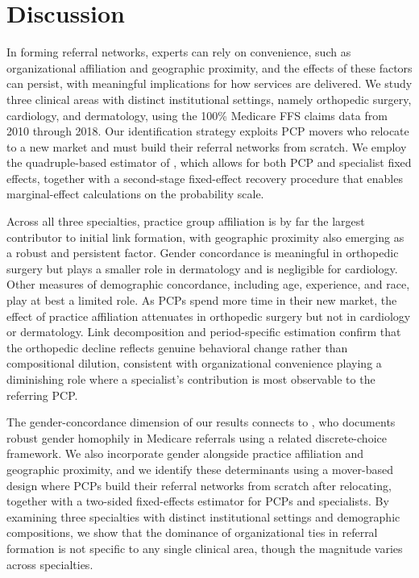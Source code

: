 \documentclass[12pt]{article}
\begin{document}

\section{Discussion}
\label{sec:discussion}

In forming referral networks, experts can rely on convenience, such as organizational affiliation and geographic proximity, and the effects of these factors can persist, with meaningful implications for how services are delivered. We study three clinical areas with distinct institutional settings, namely orthopedic surgery, cardiology, and dermatology, using the 100\% Medicare FFS claims data from 2010 through 2018. Our identification strategy exploits PCP movers who relocate to a new market and must build their referral networks from scratch. We employ the quadruple-based estimator of \cite{jochmans2018}, which allows for both PCP and specialist fixed effects, together with a second-stage fixed-effect recovery procedure that enables marginal-effect calculations on the probability scale.

Across all three specialties, practice group affiliation is by far the largest contributor to initial link formation, with geographic proximity also emerging as a robust and persistent factor. Gender concordance is meaningful in orthopedic surgery but plays a smaller role in dermatology and is negligible for cardiology. Other measures of demographic concordance, including age, experience, and race, play at best a limited role. As PCPs spend more time in their new market, the effect of practice affiliation attenuates in orthopedic surgery but not in cardiology or dermatology. Link decomposition and period-specific estimation confirm that the orthopedic decline reflects genuine behavioral change rather than compositional dilution, consistent with organizational convenience playing a diminishing role where a specialist's contribution is most observable to the referring PCP.

The gender-concordance dimension of our results connects to \citet{zeltzer2020}, who documents robust gender homophily in Medicare referrals using a related discrete-choice framework. We also incorporate gender alongside practice affiliation and geographic proximity, and we identify these determinants using a mover-based design where PCPs build their referral networks from scratch after relocating, together with a two-sided fixed-effects estimator for PCPs and specialists. By examining three specialties with distinct institutional settings and demographic compositions, we show that the dominance of organizational ties in referral formation is not specific to any single clinical area, though the magnitude varies across specialties.
\end{document}
